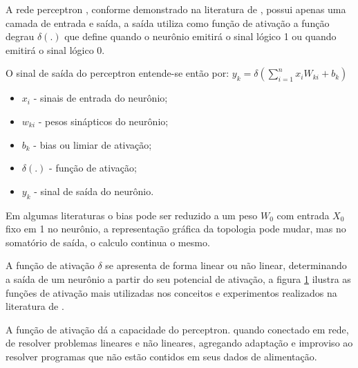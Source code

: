     A rede perceptron , conforme demonstrado na literatura de , possui apenas uma camada de entrada e saída, a saída utiliza como função de ativação a função degrau $ \delta(.) $ que define quando o neurônio emitirá o sinal lógico 1 ou quando emitirá o sinal lógico 0.
    
    O sinal de saída do perceptron entende-se então por:
    $y_k= \delta(\sum_{i=1}^{n}x_i W_{ki}+b_k)$
    \begin{itemize}
    	\item $ x_i $ - sinais de entrada do neurônio;
    	\item $ w_{ki} $ - pesos sinápticos do neurônio;
    	\item $ b_k $ - bias ou limiar de ativação;
    	\item $ \delta(.) $ - função de ativação;
    	\item $ y_k $ - sinal de saída do neurônio.
    \end{itemize}
    
    \begin{figure}[H]
    \end{figure}
    
     Em algumas literaturas o bias pode ser reduzido a um peso $W_0$ com entrada $X_0$ fixo em 1 no neurônio, a representação gráfica da topologia pode mudar, mas no somatório de saída, o calculo continua o mesmo.
    
     A função de ativação $\delta$ se apresenta de forma linear ou não linear, determinando a saída de um neurônio a partir do seu potencial de ativação, a figura \ref{fig:activation_functions} ilustra as funções de ativação mais utilizadas nos conceitos e experimentos realizados na literatura de \cite{MCAI}.
    
     \begin{figure}[H]
     \label{fig:activation_functions}
    \end{figure}
    
     A função de ativação dá a capacidade do perceptron. quando conectado em rede, de resolver problemas lineares e não lineares, agregando adaptação e improviso ao resolver programas que não estão contidos em seus dados de alimentação.
     
